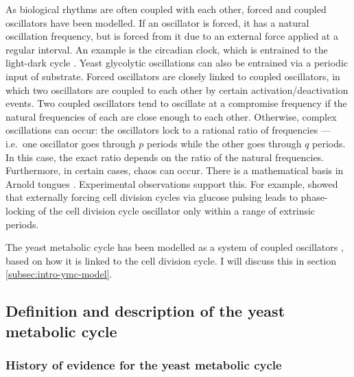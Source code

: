 As biological rhythms are often coupled with each other, forced and coupled oscillators have been modelled.
If an oscillator is forced, it has a natural oscillation frequency, but is forced from it due to an external force applied at a regular interval.
An example is the circadian clock, which is entrained to the light-dark cycle \parencite{goldbeterMultisynchronizationOtherPatterns}.
Yeast glycolytic oscillations can also be entrained via a periodic input of substrate.
Forced oscillators are closely linked to coupled oscillators, in which two oscillators are coupled to each other by certain activation/deactivation events.
Two coupled oscillators tend to oscillate at a compromise frequency if the natural frequencies of each are close enough to each other.
Otherwise, complex oscillations can occur: the oscillators lock to a rational ratio of frequencies --- i.e.\ one oscillator goes through $p$ periods while the other goes through $q$ periods.
In this case, the exact ratio depends on the ratio of the natural frequencies.
Furthermore, in certain cases, chaos can occur.
There is a mathematical basis in Arnold tongues \citep{heltbergTaleTwoRhythms2021}.
Experimental observations support this.
For example, \citet{charvinForcedPeriodicExpression2009} showed that externally forcing cell division cycles via glucose pulsing leads to phase-locking of the cell division cycle oscillator only within a range of extrinsic periods.

The yeast metabolic cycle has been modelled as a system of coupled oscillators \citep{papagiannakisAutonomousMetabolicOscillations2017,ozsezenInferenceHighLevelInteraction2019}, based on how it is linked to the cell division cycle.
I will discuss this in section \ref{subsec:intro-ymc-model}.

\subsection{Definition and description of the yeast metabolic cycle}
\label{subsec:intro-ymc-definition}

\subsubsection{History of evidence for the yeast metabolic cycle}
\label{subsubsec:intro-ymc-definition-history}

